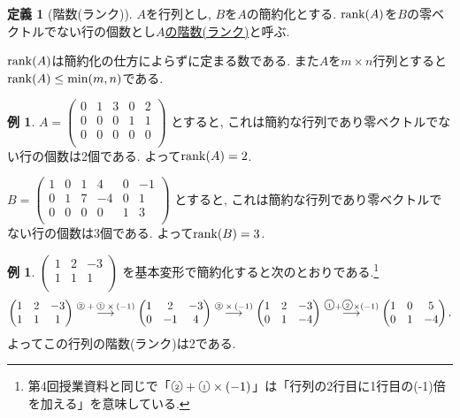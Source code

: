 \documentclass[dvipdfmx,a4paper,11pt]{article}
\newcommand{\maru}[1]{\raise0.2ex\hbox{\textcircled{\tiny{#1}}}}
\theoremstyle{definition}
\newtheorem{dfn}[thm]{定義}
\newtheorem{exa}[thm]{例}
\begin{document}
 \begin{tcolorbox}[
    colback = white,
    colframe = green!35!black,
    fonttitle = \bfseries,
    breakable = true]
    \begin{dfn}[階数(ランク)]
$A$を行列とし, $B$を$A$の簡約化とする.
${\rm rank}(A)$を$B$の零ベクトルでない行の個数とし\underline{$A$の階数(ランク)}と呼ぶ.
   \end{dfn}
 \end{tcolorbox}
${\rm rank}(A)$は簡約化の仕方によらずに定まる数である.
また$A$を$m\times n$行列とすると${\rm rank}(A) \le \min(m,n)$である.
\begin{exa}
$A=
 \begin{pmatrix}
 0& 1& 3  & 0&2\\
 0& 0& 0  & 1&1\\
 0& 0& 0 & 0&0\\
 \end{pmatrix}
 $
 とすると, これは簡約な行列であり零ベクトルでない行の個数は2個である. よって${\rm rank}(A)=2$.
 
 $B= \begin{pmatrix}
 1& 0& 1  & 4&0&-1\\
 0& 1& 7 & -4&0&1\\
 0& 0& 0 & 0&1&3\\
 \end{pmatrix}
 $ とすると, これは簡約な行列であり零ベクトルでない行の個数は3個である. よって${\rm rank}(B)=3$.
\end{exa}

\begin{exa}
$
 \begin{pmatrix}
 1& 2& -3  \\
 1& 1& 1  \\
 \end{pmatrix}
 $
 を基本変形で簡約化すると次のとおりである.\footnote{第4回授業資料と同じで「$\maru{2} + \maru{1}\times(-1)$」は「行列の2行目に1行目の(-1)倍を加える」を意味している.}
 \begin{align*}
  \begin{pmatrix}
 1& 2& -3  \\
 1& 1& 1  \\
 \end{pmatrix}
 \overset{\text{$\maru{2} + \maru{1}\times(-1)$}}{\longrightarrow} 
   \begin{pmatrix}
 1& 2& -3  \\
 0& -1& 4  \\
 \end{pmatrix}
 \overset{\text{$\maru{2} \times(-1)$}}{\longrightarrow} 
   \begin{pmatrix}
 1& 2& -3  \\
 0& 1& -4  \\
 \end{pmatrix}
  \overset{\maru{1} + \maru{2}\times(-1)}{\longrightarrow} 
   \begin{pmatrix}
 1& 0& 5  \\
 0& 1& -4  \\
 \end{pmatrix}.
  \end{align*}
  よってこの行列の階数(ランク)は2である.
\end{exa}
\end{document}
